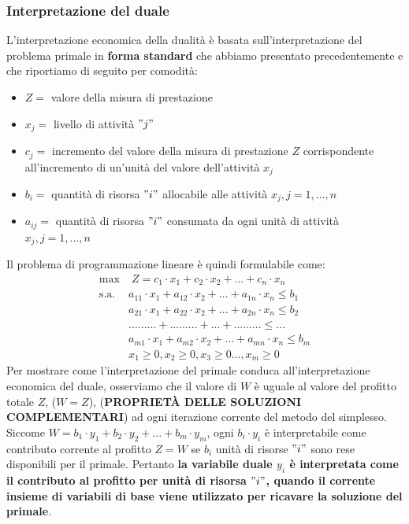 \documentclass[12pt]{article}
\begin{document}
\subsubsection{Interpretazione del duale}
L'interpretazione economica della dualità è basata sull'interpretazione del problema primale in \textbf{forma standard} che abbiamo presentato precedentemente e che riportiamo di seguito per comodità:
\begin{itemize}
    \item $Z =$ valore della misura di prestazione
    \item $x_j =$ livello di attività $"j"$
    \item $c_j =$ incremento del valore della misura di prestazione $Z$ corrispondente all'incremento di un'unità del valore dell'attività $x_j$
    \item $b_i =$ quantità di risorsa $"i"$ allocabile alle attività $x_j, j = 1,...,n$
    \item $a_{ij} =$ quantità di risorsa $"i"$ consumata da ogni unità di attività $x_j, j = 1,...,n$
\end{itemize}
Il problema di programmazione lineare è quindi formulabile come:
\begin{equation*}
    \begin{array}{ll}
    \displaystyle \textrm{max} & \; Z = c_1 \cdot x_1 + c_2 \cdot x_2 +...+ c_n \cdot x_n\\
    \textrm{s.a.} & a_{11} \cdot x_1 + a_{12} \cdot x_2 +...+ a_{1n} \cdot x_n \leq b_1 \\
    \phantom{} & a_{21} \cdot x_1 + a_{22} \cdot x_2 +...+ a_{2n} \cdot x_n \leq b_2 \\
    \phantom{} &... ... ... + ... ... ... + ... + ... ... ... \leq ... \\
    \phantom{} & a_{m1} \cdot x_1 + a_{m2} \cdot x_2 +...+ a_{mn} \cdot x_n \leq b_m \\
    \phantom{} &x_1 \geq 0, x_2 \geq 0, x_3 \geq 0 ..., x_m \geq 0
    \end{array}
\end{equation*}
Per mostrare come l'interpretazione del primale conduca all'interpretazione economica del duale, osserviamo che il valore di $W$ è uguale al valore del profitto totale $Z$, ($W = Z$), (\textbf{PROPRIETÀ DELLE SOLUZIONI COMPLEMENTARI})
ad ogni iterazione corrente del metodo del simplesso.
Siccome $W = b_1 \cdot y_1 + b_2 \cdot y_2 + ... + b_m \cdot y_m$, ogni $b_i \cdot y_i$ è interpretabile come contributo corrente al profitto
$Z = W$ se $b_i$ unità di risorse $"i"$ sono rese disponibili per il primale. Pertanto \textbf{la variabile duale $y_i$ è interpretata come il contributo al profitto per unità di risorsa $"i"$, quando il corrente insieme di variabili di base viene utilizzato per ricavare la soluzione del primale}.
\end{document}
